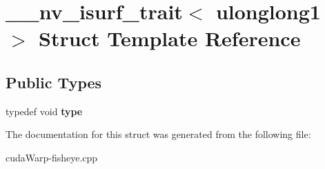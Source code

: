\hypertarget{struct____nv__isurf__trait_3_01ulonglong1_01_4}{}\section{\+\_\+\+\_\+nv\+\_\+isurf\+\_\+trait$<$ ulonglong1 $>$ Struct Template Reference}
\label{struct____nv__isurf__trait_3_01ulonglong1_01_4}
\subsection*{Public Types}
\begin{DoxyCompactItemize}
\item 
typedef void {\bfseries type}\hypertarget{struct____nv__isurf__trait_3_01ulonglong1_01_4_afacd10cc1a14259a654e33855ace8314}{}\label{struct____nv__isurf__trait_3_01ulonglong1_01_4_afacd10cc1a14259a654e33855ace8314}

\end{DoxyCompactItemize}


The documentation for this struct was generated from the following file\+:\begin{DoxyCompactItemize}
\item 
cuda\+Warp-\/fisheye.\+cpp\end{DoxyCompactItemize}
